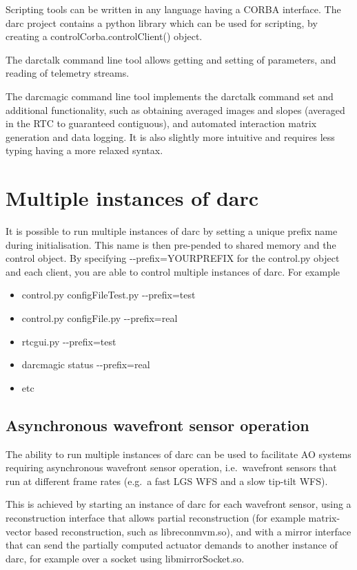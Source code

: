 \documentclass[a4,10pt]{article}
\begin{document}
Scripting tools can be written in any language having a CORBA
interface.  The darc project contains a python library which can be
used for scripting, by creating a controlCorba.controlClient() object.

The darctalk command line tool allows getting and setting of
parameters, and reading of telemetry streams.

The darcmagic command line tool implements the darctalk command set
and additional functionality, such as obtaining averaged images and
slopes (averaged in the RTC to guaranteed contiguous), and automated
interaction matrix generation and data logging.  It is also slightly
more intuitive and requires less typing having a more relaxed syntax.

\section{Multiple instances of darc}
It is possible to run multiple instances of darc by setting a unique prefix
name during initialisation.  This name is then pre-pended to shared
memory and the control object.  By specifying -{-}prefix=YOURPREFIX for
the control.py object and each client, you are able to control
multiple instances of darc.  For example
\begin{itemize}
\item control.py configFileTest.py -{-}prefix=test
\item control.py configFile.py -{-}prefix=real
\item rtcgui.py -{-}prefix=test
\item darcmagic status -{-}prefix=real
\item etc
\end{itemize}

\subsection{Asynchronous wavefront sensor operation}
The ability to run multiple instances of darc can be used to
facilitate AO systems requiring asynchronous wavefront sensor
operation, i.e.\ wavefront sensors that run at different frame rates
(e.g.\ a fast LGS WFS and a slow tip-tilt WFS).

This is achieved by starting an instance of darc for each wavefront
sensor, using a reconstruction interface that allows partial
reconstruction (for example matrix-vector based reconstruction, such
as libreconmvm.so), and with a mirror interface that can send the
partially computed actuator demands to another instance of darc, for
example over a socket using libmirrorSocket.so.
\end{document}
